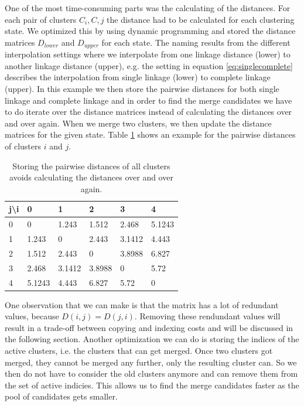 One of the most time-consuming parts was the calculating of the distances. For each pair of clusters $C_i, C,j$ the distance had to be calculated for each clustering state. We optimized this by using dynamic programming and stored the distance matrices $D_{lower}$ and $D_{upper}$ for each state. The naming results from the different interpolation settings where we interpolate from one linkage distance (lower) to another linkage distance (upper), e.g. the setting in equation \ref{eq:singlecomplete} describes the interpolation from single linkage (lower) to complete linkage (upper). In this example we then store the pairwise distances for both single linkage and complete linkage and in order to find the merge candidates we have to do iterate over the distance matrices instead of calculating the distances over and over again. When we merge two clusters, we then update the distance matrices for the given state. Table \ref{dp:distances} shows an example for the pairwise distances of clusters $i$ and $j$.

\begin{table}[h]
    \centering
    \begin{tabular}{|l | l l l l l|}
    \hline
    j\textbackslash i & 0 & 1 & 2 & 3 & 4\\ \hline
    0 & 0 & 1.243 & 1.512 & 2.468 & 5.1243\\
    1 & 1.243 & 0 & 2.443 & 3.1412 & 4.443\\
    2 & 1.512 & 2.443 & 0 & 3.8988 & 6.827\\
    3 & 2.468 & 3.1412 & 3.8988 & 0 & 5.72\\
    4 & 5.1243 & 4.443 & 6.827 & 5.72 & 0\\ \hline
    \end{tabular}
    \caption{Storing the pairwise distances of all clusters avoids calculating the distances over and over again.}
    \label{dp:distances}
\end{table}

One observation that we can make is that the matrix has a lot of redundant values, because $D(i,j) = D(j,i)$. Removing these rendundant values will result in a trade-off between copying and indexing costs and will be discussed in the following section. Another optimization we can do is storing the indices of the active clusters, i.e. the clusters that can get merged. Once two clusters got merged, they cannot be merged any further, only the resulting cluster can. So we then do not have to consider the old clusters anymore and can remove them from the set of active indicies. This allows us to find the merge candidates faster as the pool of candidates gets smaller.

